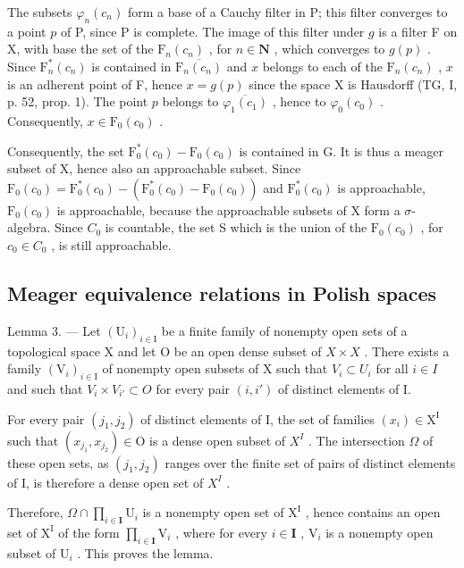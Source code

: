 The subsets \(\varphi_n(c_n)\) form a base of a Cauchy filter in P; this filter converges to a point \(p\) of P, since P is complete. The image of this filter under \(g\) is a filter F on X, with base the set of the \(\mathrm{F}_n(c_n)\) , for \(n\in \mathbf{N}\) , which converges to \(g(p)\) . Since \(\mathrm{F}_n^* (c_n)\) is contained in \(\overline{\mathrm{F}_n(c_n)}\) and \(x\) belongs to each of the \(\mathrm{F}_n(c_n)\) , \(x\) is an adherent point of F, hence \(x = g(p)\) since the space X is Hausdorff (TG, I, p. 52, prop. 1). The point \(p\) belongs to \(\overline{\varphi_1(c_1)}\) , hence to \(\varphi_0(c_0)\) . Consequently, \(x\in \mathrm{F}_0(c_0)\) .

Consequently, the set \(\mathrm{F}_{0}^{*}(c_{0}) - \mathrm{F}_{0}(c_{0})\) is contained in G. It is thus a meager subset of X, hence also an approachable subset. Since \(\mathrm{F}_{0}(c_{0}) = \mathrm{F}_{0}^{*}(c_{0}) - (\mathrm{F}_{0}^{*}(c_{0}) - \mathrm{F}_{0}(c_{0}))\) and \(\mathrm{F}_{0}^{*}(c_{0})\) is approachable, \(\mathrm{F}_{0}(c_{0})\) is approachable, because the approachable subsets of X form a \(\sigma\)-algebra. Since \(C_{0}\) is countable, the set S which is the union of the \(\mathrm{F}_{0}(c_{0})\) , for \(c_{0} \in C_{0}\) , is still approachable.

\subsection{Meager equivalence relations in Polish spaces}

Lemma 3. --- Let \((\mathrm{U}_{i})_{i\in\mathrm{I}}\) be a finite family of nonempty open sets of a topological space X and let O be an open dense subset of \(X\times X\) . There exists a family \((\mathrm{V}_{i})_{i\in\mathrm{I}}\) of nonempty open subsets of X such that \(V_{i}\subset U_{i}\) for all \(i\in I\) and such that \(V_{i}\times V_{i'}\subset O\) for every pair \((i,i')\) of distinct elements of I.

For every pair \((j_{1}, j_{2})\) of distinct elements of I, the set of families \((x_{i}) \in \mathrm{X}^{\mathrm{I}}\) such that \((x_{j_{1}}, x_{j_{2}}) \in \mathrm{O}\) is a dense open subset of \(X^{I}\) . The intersection \(\Omega\) of these open sets, as \((j_{1}, j_{2})\) ranges over the finite set of pairs of distinct elements of I, is therefore a dense open set of \(X^{I}\) .

Therefore, \(\Omega \cap \prod_{i\in \mathbf{I}}\mathrm{U}_i\) is a nonempty open set of \(\mathrm{X}^{\mathrm{I}}\) , hence contains an open set of \(\mathrm{X}^{\mathrm{I}}\) of the form \(\prod_{i\in \mathbf{I}}\mathrm{V}_i\) , where for every \(i\in \mathbf{I}\) , \(\mathrm{V}_i\) is a nonempty open subset of \(\mathrm{U}_i\) . This proves the lemma.

